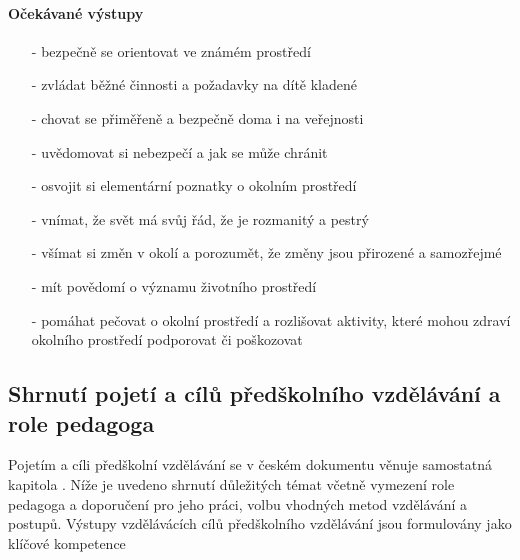 				\paragraph{Očekávané výstupy}

				\begin{itemize}
				\setlength\itemsep{-2mm}
					\item[-]bezpečně se orientovat ve známém prostředí
					\item[-]zvládat běžné činnosti a požadavky na dítě kladené
					\item[-]chovat se přiměřeně a bezpečně doma i na veřejnosti
					\item[-]uvědomovat si nebezpečí a jak se může chránit
					\item[-]osvojit si elementární poznatky o okolním prostředí
					\item[-]vnímat, že svět má svůj řád, že je rozmanitý a pestrý
					\item[-]všímat si změn v okolí a porozumět, že změny jsou přirozené a samozřejmé
					\item[-]mít povědomí o významu životního prostředí
					\item[-]pomáhat pečovat o okolní prostředí a rozlišovat aktivity, které mohou zdraví okolního prostředí podporovat či poškozovat
				\end{itemize}

 			\subsection{Shrnutí pojetí a cílů předškolního vzdělávání a role pedagoga}

				Pojetím a cíli předškolní vzdělávání se v českém dokumentu věnuje samostatná kapitola . Níže je uvedeno shrnutí důležitých témat včetně vymezení role pedagoga a doporučení pro jeho práci, volbu vhodných metod vzdělávání a postupů. Výstupy vzdělávácích cílů předškolního vzdělávání jsou formulovány jako klíčové kompetence			

